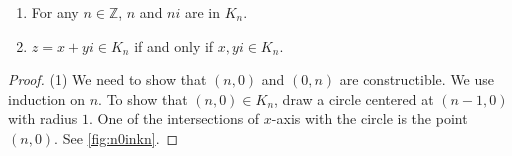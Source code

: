 \documentclass[twoside]{article}
\newcommand\Z{\mathbb Z}
\theoremstyle{remark}
\begin{document}
\begin{lemma}
  \begin{enumerate}[label=\textup{(\arabic*)}, nosep]
    \item For any \(n \in \Z\), \(n\) and \(ni\) are in \(K_n\).
    \item \(z = x + yi \in K_n\) if and only if \(x, yi \in K_n\).
  \end{enumerate}
\end{lemma}

\begin{proof}
  (1) We need to show that \((n,0)\) and \((0,n)\) are constructible. We use induction on \(n\). To show that \((n,0) \in K_n\), draw a circle centered at \((n-1,0)\) with radius \(1\). One of the intersections of \(x\)-axis with the circle is the point \((n,0)\). See \autoref{fig:n0inkn}.
  

\end{proof}
\end{document}
